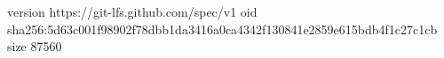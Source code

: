 version https://git-lfs.github.com/spec/v1
oid sha256:5d63c001f98902f78dbb1da3416a0ca4342f130841e2859e615bdb4f1c27c1cb
size 87560
